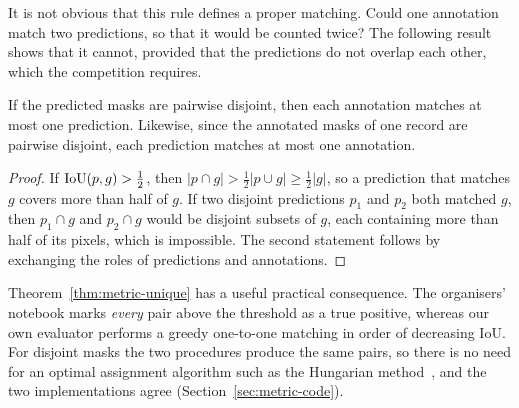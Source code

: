 It is not obvious that this rule defines a proper matching. Could one annotation match two
predictions, so that it would be counted twice? The following result shows that it cannot,
provided that the predictions do not overlap each other, which the competition requires.

\begin{theorem}\label{thm:metric-unique}
If the predicted masks are pairwise disjoint, then each annotation matches at most one prediction.
Likewise, since the annotated masks of one record are pairwise disjoint, each prediction matches at
most one annotation.
\end{theorem}
\begin{proof}
If $\mathrm{IoU}(p,g)>\tfrac12$, then $|p\cap g|>\tfrac12|p\cup g|\ge\tfrac12|g|$, so a prediction that
matches $g$ covers more than half of $g$. If two disjoint predictions $p_1$ and $p_2$ both matched
$g$, then $p_1\cap g$ and $p_2\cap g$ would be disjoint subsets of $g$, each containing more than
half of its pixels, which is impossible. The second statement follows by exchanging the roles of
predictions and annotations.
\end{proof}

Theorem~\ref{thm:metric-unique} has a useful practical consequence. The organisers' notebook marks
\emph{every} pair above the threshold as a true positive, whereas our own evaluator performs a
greedy one-to-one matching in order of decreasing IoU. For disjoint masks the two procedures produce
the same pairs, so there is no need for an optimal assignment algorithm such as the Hungarian
method~\citep{kuhn,munkres1957}, and the two
implementations agree (Section~\ref{sec:metric-code}).


